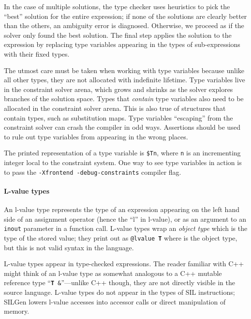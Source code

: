 \documentclass[../generics]{subfiles}
\begin{document}
In the case of multiple solutions, the type checker uses heuristics to pick the ``best'' solution for the entire expression; if none of the solutions are clearly better than the others, an ambiguity error is diagnosed. Otherwise, we proceed as if the solver only found the best solution. The final step applies the solution to the expression by replacing type variables appearing in the types of sub-expressions with their fixed types.

The utmost care must be taken when working with type variables because unlike all other types, they are not allocated with indefinite lifetime. Type variables live in the constraint solver arena, which grows and shrinks as the solver explores branches of the solution space. Types that \emph{contain} type variables also need to be allocated in the constraint solver arena. This is also true of structures that contain types, such as substitution maps. Type variables ``escaping'' from the constraint solver can crash the compiler in odd ways. Assertions should be used to rule out type variables from appearing in the wrong places.

The printed representation of a type variable is \texttt{\$Tn}, where \texttt{n} is an incrementing integer local to the constraint system. One way to see type variables in action is to pass the \texttt{-Xfrontend~-debug-constraints} compiler flag.

\paragraph{L-value types}
An l-value type represents the type of an expression appearing on the left hand side of an assignment operator (hence the ``l'' in l-value), or as an argument to an \texttt{inout} parameter in a function call. L-value types wrap an \emph{object type} which is the type of the stored value; they print out as \texttt{@lvalue~\textbf{T}} where  is the object type, but this is not valid syntax in the language.

L-value types appear in type-checked expressions. The reader familiar with C++ might think of an l-value type as somewhat analogous to a C++ mutable reference type ``\texttt{\textbf{T}~\&}''---unlike C++ though, they are not directly visible in the source language. L-value types do not appear in the types of SIL instructions; SILGen lowers l-value accesses into accessor calls or direct manipulation of memory.
\end{document}

